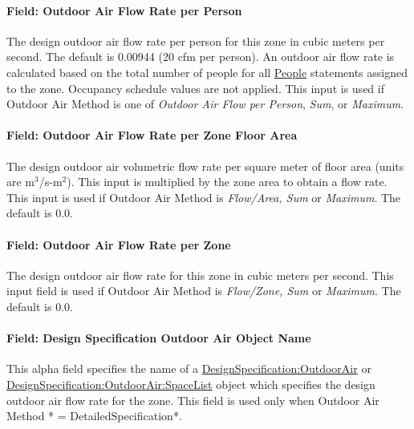 \paragraph{Field: Outdoor Air Flow Rate per Person}\label{field-outdoor-air-flow-rate-per-person-1}

The design outdoor air flow rate per person for this zone in cubic meters per second. The default is 0.00944 (20 cfm per person). An outdoor air flow rate is calculated based on the total number of people for all \hyperref[people]{People} statements assigned to the zone. Occupancy schedule values are not applied. This input is used if Outdoor Air Method is one of \emph{Outdoor Air Flow per Person}, \emph{Sum}, or \emph{Maximum.}

\paragraph{Field: Outdoor Air Flow Rate per Zone Floor Area}\label{field-outdoor-air-flow-rate-per-zone-floor-area-1}

The design outdoor air volumetric flow rate per square meter of floor area (units are m\(^{3}\)/s-m\(^{2}\)). This input is multiplied by the zone area to obtain a flow rate. This input is used if Outdoor Air Method is \emph{Flow/Area, Sum} or \emph{Maximum}. The default is 0.0.

\paragraph{Field: Outdoor Air Flow Rate per Zone}\label{field-outdoor-air-flow-rate-per-zone-1}

The design outdoor air flow rate for this zone in cubic meters per second. This input field is used if Outdoor Air Method is \emph{Flow/Zone, Sum} or \emph{Maximum}. The default is 0.0.

\paragraph{Field: Design Specification Outdoor Air Object Name}\label{field-design-specification-outdoor-air-object-name-1-000}

This alpha field specifies the name of a \hyperref[designspecificationoutdoorair]{DesignSpecification:OutdoorAir} or \hyperref[designspecificationoutdoorairspacelist]{DesignSpecification:OutdoorAir:SpaceList} object which specifies the design outdoor air flow rate for the zone. This field is used only when Outdoor Air Method * = DetailedSpecification*.

